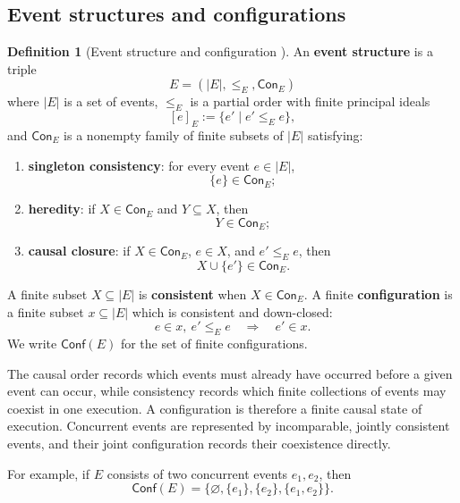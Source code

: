\documentclass[oneside]{article}
\newcommand{\Conf}{\mathsf{Conf}}
\theoremstyle{plain}
\theoremstyle{definition}
\newtheorem{definition}[theorem]{Definition}
\theoremstyle{remark}
\begin{document}
\subsection{Event structures and configurations}

\begin{definition}[Event structure and configuration
{\cite[Def.~2.1]{CastellanClairambaultWinskel2019}}]
\label{def:cgqg-event-structure-background}
    An \textbf{event structure} is a triple
    \[
        E=(|E|,\le_E,\mathsf{Con}_E)
    \]
    where \(|E|\) is a set of events, \(\le_E\) is a partial order with finite principal ideals
    \[
        [e]_E:=\{e'\mid e'\le_E e\},
    \]
    and \(\mathsf{Con}_E\) is a nonempty family of finite subsets of \(|E|\) satisfying:
    \begin{enumerate}
        \item \textbf{singleton consistency}: for every event \(e\in |E|\),
        \[
            \{e\}\in\mathsf{Con}_E;
        \]

        \item \textbf{heredity}: if \(X\in\mathsf{Con}_E\) and \(Y\subseteq X\), then
        \[
            Y\in\mathsf{Con}_E;
        \]

        \item \textbf{causal closure}: if \(X\in\mathsf{Con}_E\), \(e\in X\), and \(e'\le_E e\), then
        \[
            X\cup\{e'\}\in\mathsf{Con}_E.
        \]
    \end{enumerate}
    A finite subset \(X\subseteq |E|\) is \textbf{consistent} when \(X\in\mathsf{Con}_E\). A finite \textbf{configuration} is a finite subset \(x\subseteq |E|\) which is consistent and down-closed:
    \[
        e\in x,\ e'\le_E e
        \quad\Longrightarrow\quad
        e'\in x.
    \]
    We write \(\Conf(E)\) for the set of finite configurations.
\end{definition}

The causal order records which events must already have occurred before a given event can occur, while consistency records which finite collections of events may coexist in one execution. A configuration is therefore a finite causal state of execution. Concurrent events are represented by incomparable, jointly consistent events, and their joint configuration records their coexistence directly.

For example, if \(E\) consists of two concurrent events \(e_1,e_2\), then
\[
    \Conf(E)=
    \{\varnothing,\{e_1\},\{e_2\},\{e_1,e_2\}\}.
\]
\end{document}
